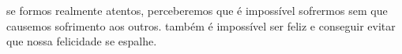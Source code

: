 se formos realmente atentos, perceberemos que é impossível sofrermos sem que causemos sofrimento aos outros. também é impossível ser feliz e conseguir evitar que nossa felicidade se espalhe.
